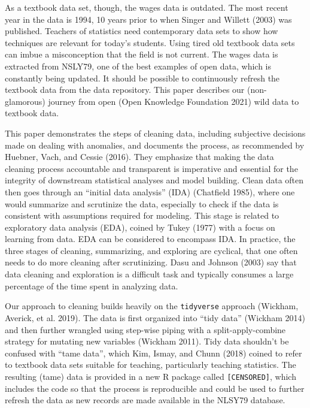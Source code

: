 \documentclass[12pt]{article}
\begin{document}
As a textbook data set, though, the wages data is outdated. The most recent year in the data is 1994, 10 years prior to when Singer and Willett (2003) was published. Teachers of statistics need contemporary data sets to show how techniques are relevant for today's students. Using tired old textbook data sets can imbue a misconception that the field is not current. The wages data is extracted from NSLY79, one of the best examples of open data, which is constantly being updated. It should be possible to continuously refresh the textbook data from the data repository. This paper describes our (non-glamorous) journey from open (Open Knowledge Foundation 2021) wild data to textbook data.

This paper demonstrates the steps of cleaning data, including subjective decisions made on dealing with anomalies, and documents the process, as recommended by Huebner, Vach, and Cessie (2016). They emphasize that making the data cleaning process accountable and transparent is imperative and essential for the integrity of downstream statistical analyses and model building. Clean data often then goes through an ``initial data analysis'' (IDA) (Chatfield 1985), where one would summarize and scrutinize the data, especially to check if the data is consistent with assumptions required for modeling. This stage is related to exploratory data analysis (EDA), coined by Tukey (1977) with a focus on learning from data. EDA can be considered to encompass IDA. In practice, the three stages of cleaning, summarizing, and exploring are cyclical, that one often needs to do more cleaning after scrutinizing. Dasu and Johnson (2003) say that data cleaning and exploration is a difficult task and typically consumes a large percentage of the time spent in analyzing data.

Our approach to cleaning builds heavily on the \texttt{tidyverse} approach (Wickham, Averick, et al. 2019). The data is first organized into ``tidy data'' (Wickham 2014) and then further wrangled using step-wise piping with a split-apply-combine strategy for mutating new variables (Wickham 2011). Tidy data shouldn't be confused with ``tame data'', which Kim, Ismay, and Chunn (2018) coined to refer to textbook data sets suitable for teaching, particularly teaching statistics. The resulting (tame) data is provided in a new R package called \texttt{[CENSORED]}, which includes the code so that the process is reproducible and could be used to further refresh the data as new records are made available in the NLSY79 database.
\end{document}
